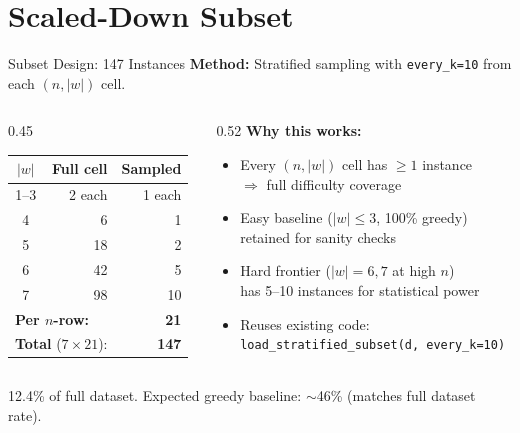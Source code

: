 \documentclass[aspectratio=169,11pt]{beamer}
\begin{document}
\section{Scaled-Down Subset}

\begin{frame}{Subset Design: 147 Instances}
  \textbf{Method:} Stratified sampling with \texttt{every\_k=10} from each $(n, |w|)$ cell.

  \medskip
  \begin{columns}[T]
    \begin{column}{0.45\textwidth}
      \small
      \begin{tabular}{crr}
        \toprule
        $|w|$ & \textbf{Full cell} & \textbf{Sampled} \\
        \midrule
        1--3 & 2 each  & 1 each \\
        4    & 6       & 1 \\
        5    & 18      & 2 \\
        6    & 42      & 5 \\
        7    & 98      & 10 \\
        \midrule
        \multicolumn{2}{l}{\textbf{Per $n$-row:}} & \textbf{21} \\
        \multicolumn{2}{l}{\textbf{Total} ($7 \times 21$):} & \textbf{147} \\
        \bottomrule
      \end{tabular}
    \end{column}
    \begin{column}{0.52\textwidth}
      \textbf{Why this works:}
      \begin{itemize}
        \item Every $(n, |w|)$ cell has $\ge 1$ instance\\
          $\Rightarrow$ full difficulty coverage
        \item Easy baseline ($|w| \le 3$, 100\% greedy)\\
          retained for sanity checks
        \item Hard frontier ($|w| = 6{,}7$ at high $n$)\\
          has 5--10 instances for statistical power
        \item Reuses existing code:\\
          \texttt{load\_stratified\_subset(d, every\_k=10)}
      \end{itemize}
    \end{column}
  \end{columns}

  \bigskip
  \footnotesize 12.4\% of full dataset.  Expected greedy baseline: $\sim$46\% (matches full dataset rate).
\end{frame}
\end{document}
